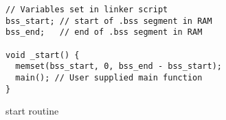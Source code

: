 \begin{listing}[H]
\begin{verbatim}
// Variables set in linker script
bss_start; // start of .bss segment in RAM
bss_end;   // end of .bss segment in RAM

void _start() {
  memset(bss_start, 0, bss_end - bss_start);
  main(); // User supplied main function
}
\end{verbatim}
\caption{start routine}
\label{lst:start}
\end{listing}
